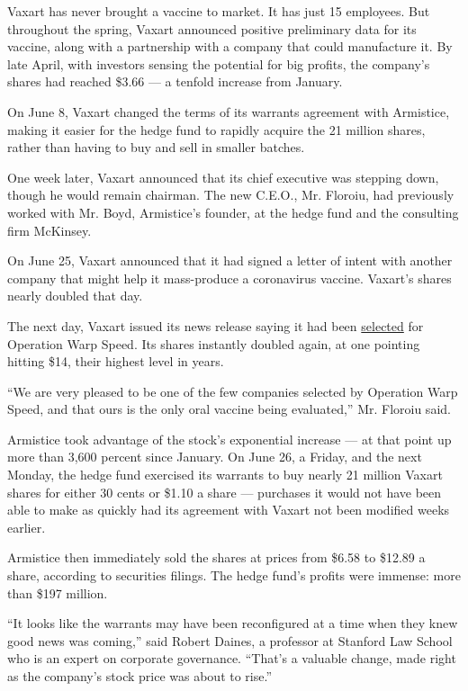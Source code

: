 Vaxart has never brought a vaccine to market. It has just 15 employees.
But throughout the spring, Vaxart announced positive preliminary data
for its vaccine, along with a partnership with a company that could
manufacture it. By late April, with investors sensing the potential for
big profits, the company's shares had reached \$3.66 --- a tenfold
increase from January.

On June 8, Vaxart changed the terms of its warrants agreement with
Armistice, making it easier for the hedge fund to rapidly acquire the 21
million shares, rather than having to buy and sell in smaller batches.

One week later, Vaxart announced that its chief executive was stepping
down, though he would remain chairman. The new C.E.O., Mr. Floroiu, had
previously worked with Mr. Boyd, Armistice's founder, at the hedge fund
and the consulting firm McKinsey.

On June 25, Vaxart announced that it had signed a letter of intent with
another company that might help it mass-produce a coronavirus vaccine.
Vaxart's shares nearly doubled that day.

The next day, Vaxart issued its news release saying it had been
\href{https://investors.vaxart.com/news-releases/news-release-details/vaxarts-covid-19-vaccine-selected-us-governments-operation-warp}{selected}
for Operation Warp Speed. Its shares instantly doubled again, at one
pointing hitting \$14, their highest level in years.

``We are very pleased to be one of the few companies selected by
Operation Warp Speed, and that ours is the only oral vaccine being
evaluated,'' Mr. Floroiu said.

Armistice took advantage of the stock's exponential increase --- at that
point up more than 3,600 percent since January. On June 26, a Friday,
and the next Monday, the hedge fund exercised its warrants to buy nearly
21 million Vaxart shares for either 30 cents or \$1.10 a share ---
purchases it would not have been able to make as quickly had its
agreement with Vaxart not been modified weeks earlier.

Armistice then immediately sold the shares at prices from \$6.58 to
\$12.89 a share, according to securities filings. The hedge fund's
profits were immense: more than \$197 million.

``It looks like the warrants may have been reconfigured at a time when
they knew good news was coming,'' said Robert Daines, a professor at
Stanford Law School who is an expert on corporate governance. ``That's a
valuable change, made right as the company's stock price was about to
rise.''

